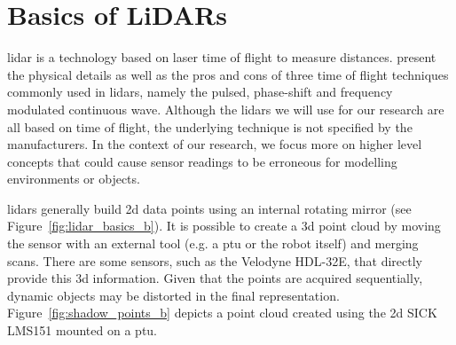 \section{Basics of LiDARs}
\label{sec:chap_lidar_basics}

\gls*{lidar} is a technology based on laser time of flight to measure distances. \citet{Bosch2001} present the physical details as well as the pros and cons of three time of flight techniques commonly used in \gls*{lidar}s, namely the pulsed, phase-shift and frequency modulated continuous wave. Although the \gls*{lidar}s we will use for our research are all based on time of flight, the underlying technique is not specified by the manufacturers. In the context of our research, we focus more on higher level concepts that could cause sensor readings to be erroneous for modelling environments or objects.

\gls*{lidar}s generally build \gls*{2d} data points using an internal rotating mirror (see Figure~\ref{fig:lidar_basics_b}). It is possible to create a \gls*{3d} point cloud by moving the sensor with an external tool (e.g. a \gls*{ptu} or the robot itself) and merging scans. There are some sensors, such as the Velodyne HDL-32E, that directly provide this \gls*{3d} information. Given that the points are acquired sequentially, dynamic objects may be distorted in the final representation. Figure~\ref{fig:shadow_points_b} depicts a point cloud created using the \gls*{2d} SICK LMS151 mounted on a \gls*{ptu}.

